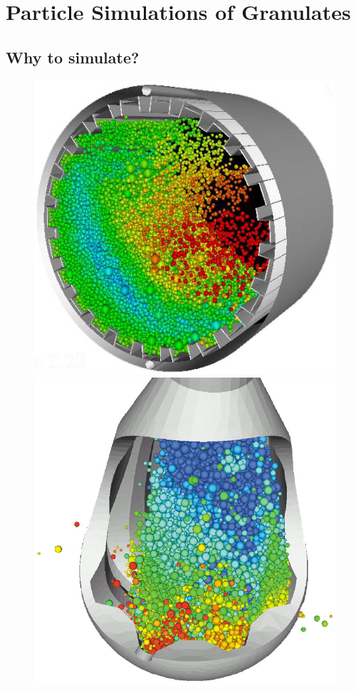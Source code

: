 \section{Particle Simulations of Granulates}

\subsection{Why to simulate? }

\begin{figure}[H]
\includegraphics[scale=0.25]{../images/Intro/simulation.jpg}
\includegraphics[scale=0.25]{../images/Intro/simulation1.jpg}
\end{figure}

